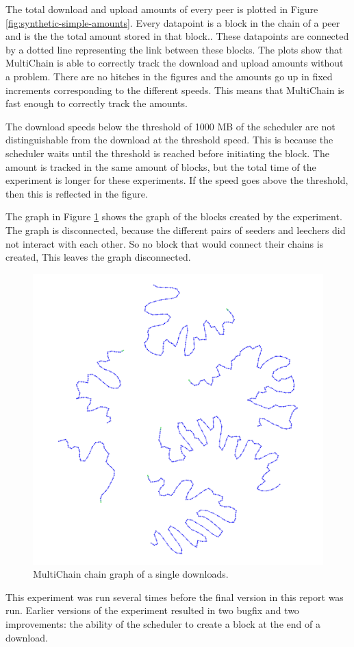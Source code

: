 The total download and upload amounts of every peer is plotted in Figure \ref{fig:synthetic-simple-amounts}.
Every datapoint is a block in the chain of a peer and is the the total amount stored in that block..
These datapoints are connected by a dotted line representing the link between these blocks.
The plots show that MultiChain is able to correctly track the download and upload amounts without a problem.
There are no hitches in the figures and the amounts go up in fixed increments corresponding to the different speeds.
This means that MultiChain is fast enough to correctly track the amounts.

The download speeds below the threshold of 1000 MB of the scheduler
are not distinguishable from the download at the threshold speed.
This is because the scheduler waits until the threshold is reached before initiating the block.
The amount is tracked in the same amount of blocks,
but the total time of the experiment is longer for these experiments.
If the speed goes above the threshold, then this is reflected in the figure.

The graph in Figure \ref{fig:synthetic-simple-graph} shows the graph of the blocks created by the experiment.
The graph is disconnected, because the different pairs of seeders and leechers did not interact with each other.
So no block that would connect their chains is created,
This leaves the graph disconnected.

\begin{figure}
	\centerline{\includegraphics[scale=0.06]{experimentation/speeds/synthetic.png}}
	\caption{MultiChain chain graph of a single downloads.}
	\label{fig:synthetic-simple-graph}
\end{figure}

This experiment was run several times before the final version in this report was run.
Earlier versions of the experiment resulted in two bugfix and two improvements:
the ability of the scheduler to create a block at the end of a download.